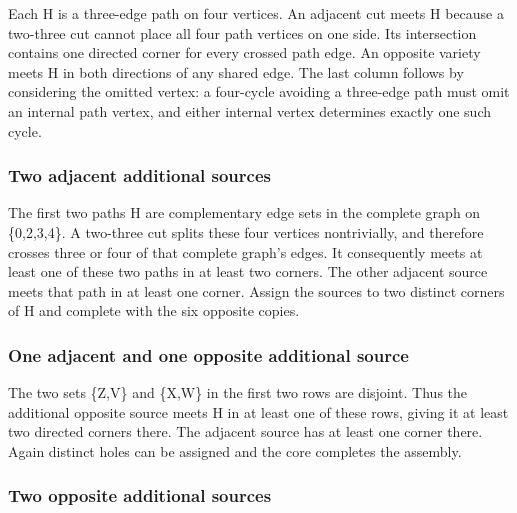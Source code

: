 \documentclass[
  10pt,
]{article}
\begin{document}
Each H is a three-edge path on four vertices. An adjacent cut meets H
because a two-three cut cannot place all four path vertices on one side.
Its intersection contains one directed corner for every crossed path
edge. An opposite variety meets H in both directions of any shared edge.
The last column follows by considering the omitted vertex: a four-cycle
avoiding a three-edge path must omit an internal path vertex, and either
internal vertex determines exactly one such cycle.

\hypertarget{two-adjacent-additional-sources}{%
\subsubsection*{Two adjacent additional
sources}\label{two-adjacent-additional-sources}}

The first two paths H are complementary edge sets in the complete graph
on \{0,2,3,4\}. A two-three cut splits these four vertices nontrivially,
and therefore crosses three or four of that complete graph's edges. It
consequently meets at least one of these two paths in at least two
corners. The other adjacent source meets that path in at least one
corner. Assign the sources to two distinct corners of H and complete
with the six opposite copies.

\hypertarget{one-adjacent-and-one-opposite-additional-source}{%
\subsubsection*{One adjacent and one opposite additional
source}\label{one-adjacent-and-one-opposite-additional-source}}

The two sets \{Z,V\} and \{X,W\} in the first two rows are disjoint.
Thus the additional opposite source meets H in at least one of these
rows, giving it at least two directed corners there. The adjacent source
has at least one corner there. Again distinct holes can be assigned and
the core completes the assembly.

\hypertarget{two-opposite-additional-sources}{%
\subsubsection*{Two opposite additional
sources}\label{two-opposite-additional-sources}}
\end{document}
